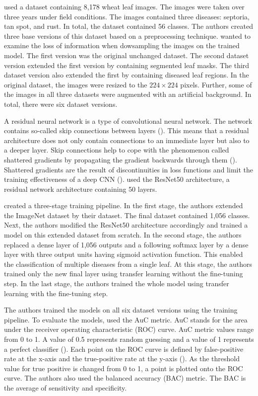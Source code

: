 \documentclass{BachelorBUI}
\begin{document}
        \textcite{Picon:2019} used a dataset containing 8,178 wheat leaf images. The images were taken over three years under field conditions. The images contained three diseases: septoria, tan spot, and rust. In total, the dataset contained 56 classes. The authors created three base versions of this dataset based on a preprocessing technique. \textcite{Picon:2019} wanted to examine the loss of information when dowsampling the images on the trained model. The first version was the original unchanged dataset. The second dataset version extended the first version by containing segmented leaf masks. The third dataset version also extended the first by containing diseased leaf regions. In the original dataset, the images were resized to the $224 \times 224$ pixels. Further, some of the images in all three datasets were augmented with an artificial background. In total, there were six dataset versions.

        A residual neural network is a type of convolutional neural network. The network contains so-called skip connections between layers (\cite{Aggarwal:2018}). This means that a residual architecture does not only contain connections to an immediate layer but also to a deeper layer. Skip connections help to cope with the phenomenon called shattered gradients by propagating the gradient backwards through them (\cite{Bishop:2024}). Shattered gradients are the result of discontinuities in loss functions and limit the training effectiveness of a deep CNN (\cite{Bishop:2024}). \textcite{Picon:2019} used the ResNet50 architecture, a residual network architecture containing 50 layers.

        \textcite{Picon:2019} created a three-stage training pipeline. In the first stage, the authors extended the ImageNet dataset by their dataset. The final dataset contained 1,056 classes. Next, the authors modified the ResNet50 architecture accordingly and trained a model on this extended dataset from scratch. In the second stage, the authors replaced a dense layer of 1,056 outputs and a following softmax layer by a dense layer with three output units having sigmoid activation function. This enabled the classification of multiple diseases from a single leaf. At this stage, the authors trained only the new final layer using transfer learning without the fine-tuning step. In the last stage, the authors trained the whole model using transfer learning with the fine-tuning step.

        The authors trained the models on all six dataset versions using the training pipeline. To evaluate the models, \textcite{Picon:2019} used the AuC metric. AuC stands for the area under the receiver operating characteristic (ROC) curve. AuC metric values range from 0 to 1. A value of 0.5 represents random guessing and a value of 1 represents a perfect classifier (\cite{Bishop:2024}). Each point on the ROC curve is defined by false-positive rate at the x-axis and the true-positive rate at the y-axis (\cite{Murphy:2022}). As the threshold value for true positive is changed from 0 to 1, a point is plotted onto the ROC curve. The authors also used the balanced accuracy (BAC) metric. The BAC is the average of sensitivity and specificity.
\end{document}
